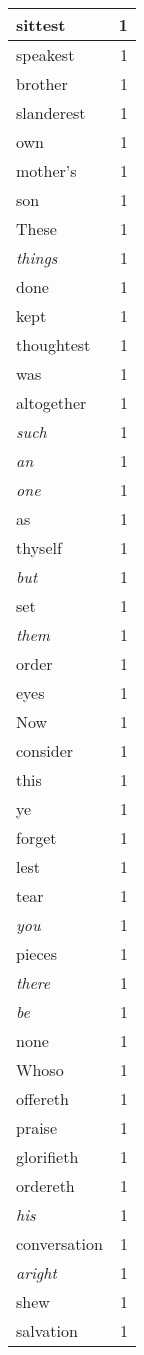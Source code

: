 \begin{center}
\begin{longtable}{l|r}
sittest & 1 \\ \hline
speakest & 1 \\ \hline
brother & 1 \\ \hline
slanderest & 1 \\ \hline
own & 1 \\ \hline
mother's & 1 \\ \hline
son & 1 \\ \hline
These & 1 \\ \hline
\emph{things} & 1 \\ \hline
done & 1 \\ \hline
kept & 1 \\ \hline
thoughtest & 1 \\ \hline
was & 1 \\ \hline
altogether & 1 \\ \hline
\emph{such} & 1 \\ \hline
\emph{an} & 1 \\ \hline
\emph{one} & 1 \\ \hline
as & 1 \\ \hline
thyself & 1 \\ \hline
\emph{but} & 1 \\ \hline
set & 1 \\ \hline
\emph{them} & 1 \\ \hline
order & 1 \\ \hline
eyes & 1 \\ \hline
Now & 1 \\ \hline
consider & 1 \\ \hline
this & 1 \\ \hline
ye & 1 \\ \hline
forget & 1 \\ \hline
lest & 1 \\ \hline
tear & 1 \\ \hline
\emph{you} & 1 \\ \hline
pieces & 1 \\ \hline
\emph{there} & 1 \\ \hline
\emph{be} & 1 \\ \hline
none & 1 \\ \hline
Whoso & 1 \\ \hline
offereth & 1 \\ \hline
praise & 1 \\ \hline
glorifieth & 1 \\ \hline
ordereth & 1 \\ \hline
\emph{his} & 1 \\ \hline
conversation & 1 \\ \hline
\emph{aright} & 1 \\ \hline
shew & 1 \\ \hline
salvation & 1 \\ \hline
\end{longtable}
\end{center}




